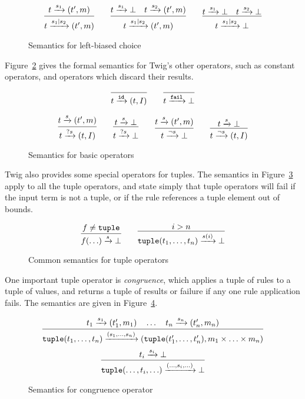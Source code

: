 \begin{figure}[ht]
\label{fig:choice}
\[
\infer
  {t \arr{s_1|s_2} (t',m)}
  {t \arr{s_1} (t',m)}
\qquad 
\infer
  {t \arr{s_1|s_2} (t',m)}
  {t \arr{s_1} \bot \quad t \arr{s_2} (t',m)}
\qquad
\infer
  {t \arr{s_1|s_2} \bot}
  {t \arr{s_1} \bot \quad t \arr{s_2} \bot}
\]
\caption{Semantics for left-biased choice}
\end{figure}

Figure~\ref{fig:basic} gives the formal semantics for Twig's other operators, such as constant operators, and operators which discard their results.

\begin{figure}[ht]
\label{fig:basic}
\[
\infer
  {t \arr{\mathtt{id}} (t,I)}
  {}
\qquad
\infer
  {t \arr{\mathtt{fail}} \bot}
  {}
\]

\[
\infer
  {t \arr{?s} (t,I)}
  {t \arr{s} (t',m)}
\qquad 
\infer
  {t \arr{?s} \bot}
  {t \arr{s} \bot}
\qquad
\infer
  {t \arr{\lnot s} \bot}
  {t \arr{s} (t',m)}
\qquad 
\infer
  {t \arr{\lnot s} (t,I)}
  {t \arr{s} \bot}
\]
\caption{Semantics for basic operators}
\end{figure}

Twig also provides some special operators for tuples. The semantics in Figure~\ref{fig:all-tuples} apply to all the tuple operators, and state simply that tuple operators will fail if the input term is not a tuple, or if the rule references a tuple element out of bounds.

\begin{figure}[ht]
\label{fig:all-tuples}
\[
\infer
  {f(\ldots) \arr{s} \bot}
  {f \neq \mathtt{tuple}}
\qquad
\infer
  {\mathtt{tuple}(t_1,\ldots,t_n) \arr{s(i)} \bot}
  {i > n}
\]
\caption{Common semantics for tuple operators}
\end{figure}

One important tuple operator is \emph{congruence}, which applies a tuple of rules to a tuple of values, and returns a tuple of results or failure if any one rule application fails. The semantics are given in Figure~\ref{fig:congruence}.

\begin{figure}[ht]
\label{fig:congruence}
\[
\infer
  {\mathtt{tuple}(t_1,\ldots,t_n)\arr{(s_1,\ldots,s_n)} (\mathtt{tuple}(t_1',\ldots,t_n'),m_1 \times \ldots \times m_n) }
  {t_1 \arr{s_1} (t_1',m_1) \quad \ldots \quad t_n \arr{s_n} (t_n',m_n)}
\]
\[
\infer
  {\mathtt{tuple}(\ldots,t_i,\ldots)\arr{(\ldots,s_i,\ldots)}\bot}
  {t_i \arr{s_i} \bot}
\]
\caption{Semantics for congruence operator}
\end{figure}

